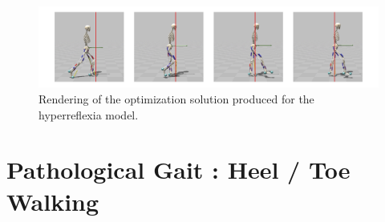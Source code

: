 \documentclass[11pt]{article}
\begin{document}
\begin{figure}[h!]
    \centering
    \includegraphics[width=\textwidth]{screens/toe_walk_hr.jpg}
    \caption{Rendering of the optimization solution produced for the hyperreflexia model.}
\end{figure}

\section{Pathological Gait : Heel / Toe Walking}
\end{document}
